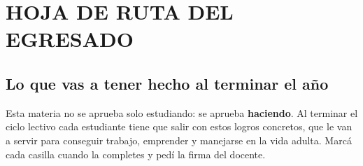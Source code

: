 \newcommand{\casilla}{\raisebox{-0.12em}{\tikz\draw[thick] (0,0) rectangle (0.34,0.34);}}
\clearpage
\section*{HOJA DE RUTA DEL EGRESADO}
\subsection*{Lo que vas a tener hecho al terminar el año}

\begin{recuadro}
Esta materia no se aprueba solo estudiando: se aprueba \textbf{haciendo}. Al terminar el ciclo
lectivo cada estudiante tiene que salir con estos logros concretos, que le van a servir para
conseguir trabajo, emprender y manejarse en la vida adulta. Marcá cada casilla cuando la
completes y pedí la firma del docente.
\end{recuadro}

